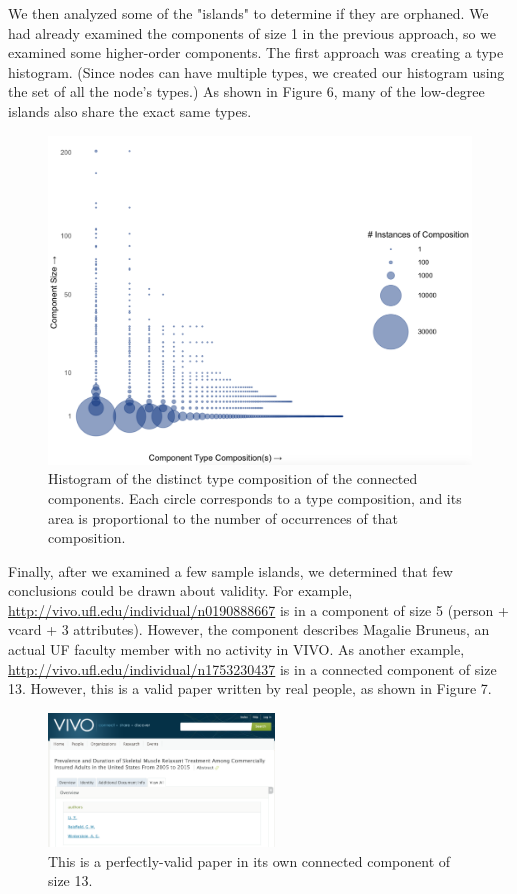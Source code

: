 \documentclass[11pt]{article}
\begin{document}
We then analyzed some of the "islands" to determine if they are orphaned. We had already examined the components of size 1 in the previous approach, so we examined some higher-order components. The first approach was creating a type histogram. (Since nodes can have multiple types, we created our histogram using the set of all the node's types.) As shown in Figure 6, many of the low-degree islands also share the exact same types.

\begin{figure}[h!]
\centering
\includegraphics[width=\textwidth]{type-histogram.png}
\caption{Histogram of the distinct type composition of the connected components. Each circle corresponds to a type composition, and its area is proportional to the number of occurrences of that composition.}
\label{fig:output}
\end{figure}

\pagebreak

Finally, after we examined a few sample islands, we determined that few conclusions could be drawn about validity. For example, \url{http://vivo.ufl.edu/individual/n0190888667} is in a component of size 5 (person + vcard + 3 attributes). However, the component describes Magalie Bruneus, an actual UF faculty member with no activity in VIVO. As another example, \url{http://vivo.ufl.edu/individual/n1753230437} is in a connected component of size 13. However, this is a valid paper written by real people, as shown in Figure 7.

\begin{figure}[h!]
\centering
\includegraphics[width=6cm]{valid-paper.png}
\caption{This is a perfectly-valid paper in its own connected component of size 13.}
\label{fig:output}
\end{figure}
\end{document}
